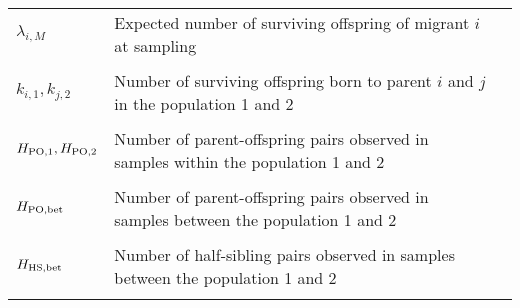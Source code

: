 \documentclass[12pt, English]{article}
\begin{document}
\begin{spacing}{1.9}
\begin{table}[tb]
\begin{center}
\begin{tabular}{llc}
	$\lambda_{i, M}$					& Expected number of surviving offspring of migrant $i$ at sampling\\
		                						& \\
	$k_{i,1}, k_{j,2}$					& Number of surviving offspring born to parent $i$ and $j$ in the population 1 and 2\\ 
	                							& \\
	$H_{\rm PO, 1}, H_{\rm PO, 2}$		& Number of parent-offspring pairs observed in samples within the population 1 and 2\\ 
	                							& \\
	$H_{\rm PO, bet}$					& Number of parent-offspring pairs observed in samples between the population 1 and 2\\ 
	                							& \\
	$H_{\rm HS, bet}$					& Number of half-sibling pairs observed in samples between the population 1 and 2\\ 
	                							& \\              		
	\hline
    \end{tabular}
    \label{symbols} 
\end{center} 
\end{table}
\renewcommand{\arraystretch}{1}

\clearpage


\end{spacing}
\end{document}
